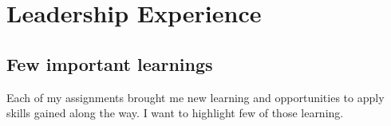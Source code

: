 \documentclass[11pt, a4paper]{awesome-cv}
\begin{document}
\newpage

\hypertarget{leadership-experience}{%
\section{Leadership Experience}\label{leadership-experience}}

\hypertarget{few-important-learnings}{%
\subsection{Few important learnings}\label{few-important-learnings}}

\footnotesize

Each of my assignments brought me new learning and opportunities to apply skills gained along the way. I want to highlight few of those learning.
\end{document}

